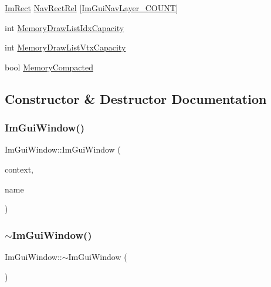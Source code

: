 \begin{DoxyCompactItemize}
\item 
\hyperlink{structImRect}{Im\+Rect} \hyperlink{structImGuiWindow_ab2115773e21400dc96f7ff6d5a4ce13b}{Nav\+Rect\+Rel} \mbox{[}\hyperlink{imgui__internal_8h_afb412215b8327dc2c6af2c19fdca64c6a7c54ca28f0db8d5e808af0ec3290b05c}{Im\+Gui\+Nav\+Layer\+\_\+\+C\+O\+U\+NT}\mbox{]}
\item 
int \hyperlink{structImGuiWindow_a9bb2a4aceef6f9e2b41b965869a5d069}{Memory\+Draw\+List\+Idx\+Capacity}
\item 
int \hyperlink{structImGuiWindow_a139cb0b35e070634619182cf153901c6}{Memory\+Draw\+List\+Vtx\+Capacity}
\item 
bool \hyperlink{structImGuiWindow_af24dffe06ae301fe592ccb3076ce1147}{Memory\+Compacted}
\end{DoxyCompactItemize}


\subsection{Constructor \& Destructor Documentation}
\mbox{\label{structImGuiWindow_acd2909ae3b7079de81d528327cc11dfd}} 
\subsubsection{\texorpdfstring{Im\+Gui\+Window()}{ImGuiWindow()}}
{\footnotesize\ttfamily Im\+Gui\+Window\+::\+Im\+Gui\+Window (\begin{DoxyParamCaption}\item[{\hyperlink{structImGuiContext}{Im\+Gui\+Context} $\ast$}]{context,  }\item[{const char $\ast$}]{name }\end{DoxyParamCaption})}

\mbox{\label{structImGuiWindow_a8e81d730c3a39a71e6b6ca4654451c53}} 
\subsubsection{\texorpdfstring{$\sim$\+Im\+Gui\+Window()}{~ImGuiWindow()}}
{\footnotesize\ttfamily Im\+Gui\+Window\+::$\sim$\+Im\+Gui\+Window (\begin{DoxyParamCaption}{ }\end{DoxyParamCaption})}



